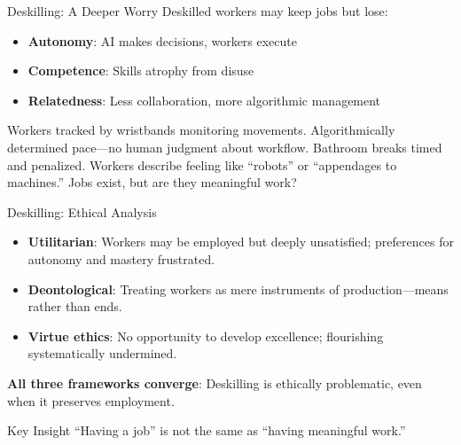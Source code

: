 ﻿\documentclass[aspectratio=169,11pt]{beamer}
\begin{document}
\begin{frame}{Deskilling: A Deeper Worry}
Deskilled workers may keep jobs but lose:
\begin{itemize}
    \item \textbf{Autonomy}: AI makes decisions, workers execute
    \item \textbf{Competence}: Skills atrophy from disuse
    \item \textbf{Relatedness}: Less collaboration, more algorithmic management
\end{itemize}

\vspace{0.2em}
\begin{casestudybox}
\scriptsize
Workers tracked by wristbands monitoring movements. Algorithmically determined pace---no human judgment about workflow. Bathroom breaks timed and penalized. Workers describe feeling like ``robots'' or ``appendages to machines.'' Jobs exist, but are they meaningful work?
\end{casestudybox}
\end{frame}

\begin{frame}{Deskilling: Ethical Analysis}
\begin{itemize}
    \item \textbf{Utilitarian}: Workers may be employed but deeply unsatisfied; preferences for autonomy and mastery frustrated.
    \item \textbf{Deontological}: Treating workers as mere instruments of production---means rather than ends.
    \item \textbf{Virtue ethics}: No opportunity to develop excellence; flourishing systematically undermined.
\end{itemize}

\vspace{0.3em}
\textbf{All three frameworks converge}: Deskilling is ethically problematic, even when it preserves employment.

\vspace{0.3em}
\begin{alertblock}{Key Insight}
``Having a job'' is not the same as ``having meaningful work.''
\end{alertblock}
\end{frame}
\end{document}
